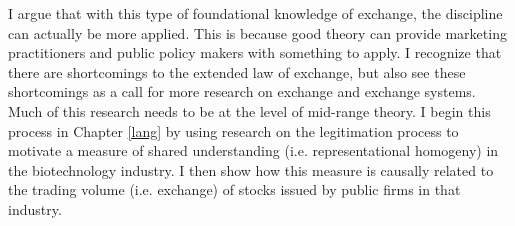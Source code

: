 I argue that with this type of foundational knowledge of exchange, the discipline can actually be more applied. This is because good theory can provide marketing practitioners and public policy makers with something to apply. I recognize that there are shortcomings to the extended law of exchange, but also see these shortcomings as a call for more research on exchange and exchange systems. Much of this research needs to be at the level of mid-range theory. I begin this process in Chapter \ref{lang} by using research on the legitimation process \citep[e.g.][]{powell2008} to motivate a measure of shared understanding (i.e. representational homogeny) in the biotechnology industry. I then show how this measure is causally related to the trading volume (i.e. exchange) of stocks issued by public firms in that industry.
